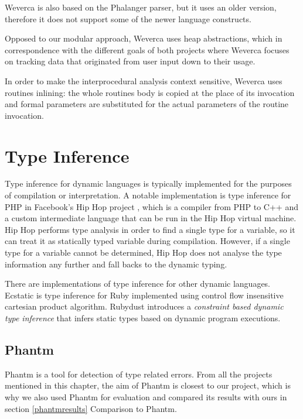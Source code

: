     Weverca is also based on the Phalanger parser, but it uses an older 
    version, therefore it does not support some of the newer language 
    constructs.
    
    Opposed to our modular approach, Weverca uses heap abstractions, 
    which in correspondence with the different goals of both projects 
    where Weverca focuses on tracking data that originated from user 
    input down to their usage.
    
    In order to make the interprocedural analysis context sensitive, 
    Weverca uses routines inlining: the whole routines body is 
    copied at the place of its invocation and formal parameters 
    are substituted for the actual parameters of the routine 
    invocation.
    

    \section{Type Inference}
    
    Type inference for dynamic languages is typically implemented 
    for the purposes of compilation or interpretation. A notable implementation 
    is type inference for PHP in Facebook's Hip Hop project \cite{zhao2012hiphop}, 
    which is a compiler from PHP to C++ and a custom intermediate language 
    that can be run in the Hip Hop virtual machine. Hip Hop performs type 
    analysis in order to find a single type for a variable, so it can treat 
    it as statically typed variable during compilation. However, if a single 
    type for a variable cannot be determined, Hip Hop does not analyse 
    the type information any further and fall backs to the dynamic typing.    
        
    There are implementations of type inference for other dynamic languages. 
    Ecstatic\cite{madsen2007ecstatic} is type inference for Ruby 
    implemented using control flow insensitive cartesian product algorithm. 
    Rubydust\cite{an2011dynamic} introduces a \emph{constraint based dynamic 
    type inference} that infers static types based on dynamic program 
    executions.

    \subsection{Phantm}
    
    Phantm\cite{kneuss2010phantm} is a tool for detection of type related 
    errors. From all the projects mentioned in this chapter, the aim of 
    Phantm is closest to our project, which is why we also used Phantm 
    for evaluation and compared its results with ours in 
    section \ref{phantmresults} Comparison to Phantm.
    
